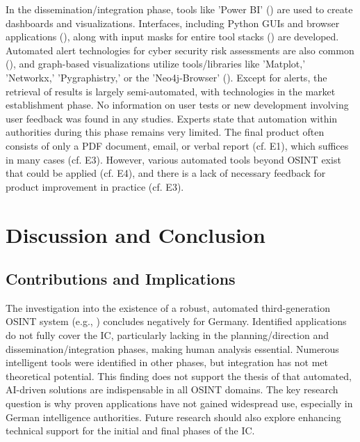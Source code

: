 \documentclass[10pt]{article}
\begin{document}
In the dissemination/integration phase, tools like 'Power BI' (\cite{Tao.2023}) are used to create dashboards and visualizations. Interfaces, including Python GUIs and browser applications (\cite{Elmas.2022}), along with input masks for entire tool stacks (\cite{Arjun.2020}) are developed. Automated alert technologies for cyber security risk assessments are also common (\cite{Ahuja.2022}), and graph-based visualizations utilize tools/libraries like 'Matplot,' 'Networkx,' 'Pygraphistry,' or the 'Neo4j-Browser' (\cite{Middleton.2020}). Except for alerts, the retrieval of results is largely semi-automated, with technologies in the market establishment phase. No information on user tests or new development involving user feedback was found in any studies. Experts state that automation within authorities during this phase remains very limited. The final product often consists of only a PDF document, email, or verbal report (cf. E1), which suffices in many cases (cf. E3). However, various automated tools beyond OSINT exist that could be applied (cf. E4), and there is a lack of necessary feedback for product improvement in practice (cf. E3).

\section{Discussion and Conclusion} \label{sec:discussion}
\subsection{Contributions and Implications}

The investigation into the existence of a robust, automated third-generation OSINT system (e.g., \cite{Ghioni.2023}) concludes negatively for Germany. Identified applications do not fully cover the IC, particularly lacking in the planning/direction and dissemination/integration phases, making human analysis essential. Numerous intelligent tools were identified in other phases, but integration has not met theoretical potential. This finding does not support the thesis of \textcite{Yogish.2021} that automated, AI-driven solutions are indispensable in all OSINT domains. The key research question is why proven applications have not gained widespread use, especially in German intelligence authorities. Future research should also explore enhancing technical support for the initial and final phases of the IC.
\end{document}
